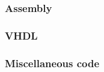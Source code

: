 \documentclass	[a4paper, 10pt]	{article}
\begin{document}
%      
%      
%      

      \subsubsection{Assembly}

%      

      \subsubsection{VHDL}

%      

      \subsubsection{Miscellaneous code}
\end{document}
